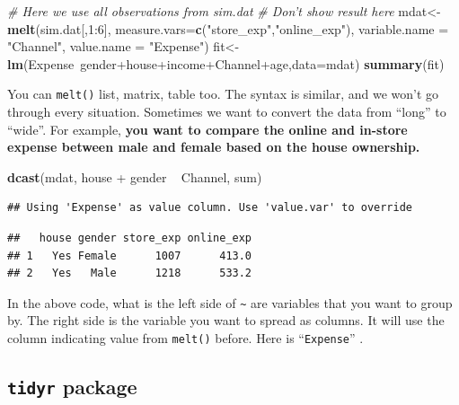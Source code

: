 \documentclass[12pt,]{krantz}
\newenvironment{Shaded}{\begin{snugshade}}{\end{snugshade}}
\newcommand{\KeywordTok}[1]{\textcolor[rgb]{0.13,0.29,0.53}{\textbf{{#1}}}}
\newcommand{\DataTypeTok}[1]{\textcolor[rgb]{0.13,0.29,0.53}{{#1}}}
\newcommand{\DecValTok}[1]{\textcolor[rgb]{0.00,0.00,0.81}{{#1}}}
\newcommand{\StringTok}[1]{\textcolor[rgb]{0.31,0.60,0.02}{{#1}}}
\newcommand{\CommentTok}[1]{\textcolor[rgb]{0.56,0.35,0.01}{\textit{{#1}}}}
\newcommand{\NormalTok}[1]{{#1}}
\theoremstyle{definition}
\theoremstyle{definition}
\theoremstyle{remark}
\begin{document}
\begin{Shaded}
\begin{Highlighting}[]
\CommentTok{# Here we use all observations from sim.dat}
\CommentTok{# Don't show result here}
\NormalTok{mdat<-}\KeywordTok{melt}\NormalTok{(sim.dat[,}\DecValTok{1}\NormalTok{:}\DecValTok{6}\NormalTok{], }\DataTypeTok{measure.vars=}\KeywordTok{c}\NormalTok{(}\StringTok{"store_exp"}\NormalTok{,}\StringTok{"online_exp"}\NormalTok{),}
            \DataTypeTok{variable.name =} \StringTok{"Channel"}\NormalTok{,}
              \DataTypeTok{value.name =} \StringTok{"Expense"}\NormalTok{)}
\NormalTok{fit<-}\KeywordTok{lm}\NormalTok{(Expense~gender+house+income+Channel+age,}\DataTypeTok{data=}\NormalTok{mdat)}
\KeywordTok{summary}\NormalTok{(fit)}
\end{Highlighting}
\end{Shaded}

You can \texttt{melt()} list, matrix, table too. The syntax is similar,
and we won't go through every situation. Sometimes we want to convert
the data from ``long'' to ``wide''. For example, \textbf{you want to
compare the online and in-store expense between male and female based on
the house ownership. }

\begin{Shaded}
\begin{Highlighting}[]
\KeywordTok{dcast}\NormalTok{(mdat, house +}\StringTok{ }\NormalTok{gender ~}\StringTok{ }\NormalTok{Channel, sum)}
\end{Highlighting}
\end{Shaded}

\begin{verbatim}
## Using 'Expense' as value column. Use 'value.var' to override
\end{verbatim}

\begin{verbatim}
##   house gender store_exp online_exp
## 1   Yes Female      1007      413.0
## 2   Yes   Male      1218      533.2
\end{verbatim}

In the above code, what is the left side of \texttt{\textasciitilde{}}
are variables that you want to group by. The right side is the variable
you want to spread as columns. It will use the column indicating value
from \texttt{melt()} before. Here is ``\texttt{Expense}'' .

\subsection{\texorpdfstring{\texttt{tidyr}
package}{tidyr package}}\label{tidyr-package}
\end{document}

